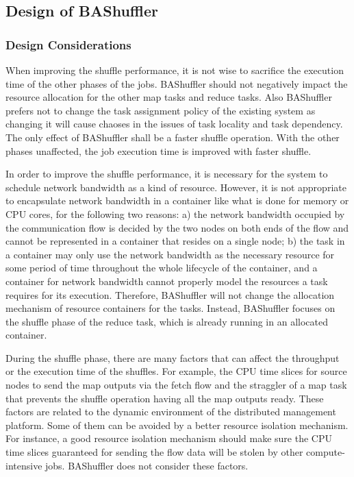 \documentclass[10pt,journal,compsoc]{IEEEtran}
\begin{document}
\subsection{Design of BAShuffler}
\subsubsection{Design Considerations}
When improving the shuffle performance, it is not wise to sacrifice 
the execution time of the other phases of the jobs. 
BAShuffler should not negatively impact the resource allocation for the other map tasks
and reduce tasks. 
Also BAShuffler prefers not to change the task assignment policy of the existing system
as changing it will cause chaoses in the issues of task locality and task dependency. 
The only effect of BAShuffler shall be a faster shuffle operation. 
With the other phases unaffected, the job execution time is improved with faster shuffle.


In order to improve the shuffle performance, 
it is necessary for the system to schedule network bandwidth as a
kind of resource.
However, it is not appropriate to encapsulate network bandwidth
in a container
like what is done for memory or CPU cores, for the following two reasons: 
a) the network bandwidth occupied by the communication flow is decided
by the two nodes on both ends of the flow
and cannot be represented in a container that resides on a single node; 
b) the task in a container may only use the network bandwidth as the
necessary resource for some period of time
throughout the whole lifecycle of the container, and a container for
network bandwidth cannot properly 
model the resources a task requires for its execution. 
Therefore, BAShuffler will not change the allocation mechanism of
resource containers for the tasks.
Instead, BAShuffler focuses on the shuffle phase of the reduce task,
which is already running in an allocated container.

During the shuffle phase, there are many factors that can
affect the throughput or the execution time of the shuffles.
For example, the CPU time slices for source nodes to send the map outputs via the fetch flow and 
the straggler of a map task that prevents the shuffle operation having all the map outputs ready. 
These factors are related to the dynamic environment of the distributed management platform. 
Some of them can be avoided by a better resource isolation mechanism. 
For instance, a good resource isolation mechanism should make sure the CPU time slices guaranteed for
sending the flow data will be stolen by other compute-intensive jobs.
BAShuffler does not consider these factors.
\end{document}
